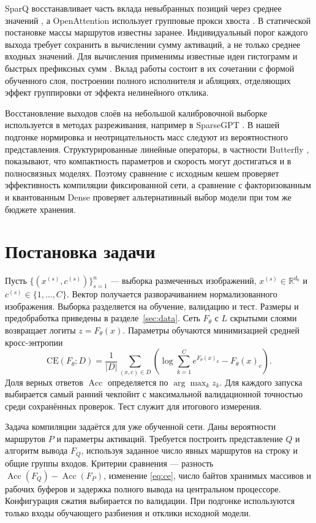 \documentclass[11pt,a4paper]{article}
\newcommand{\CE}{\mathrm{CE}}
\begin{document}
SparQ восстанавливает часть вклада невыбранных позиций через среднее значений \cite{ribar2024}, а OpenAttention использует групповые прокси хвоста \cite{yu2026}. В статической постановке массы маршрутов известны заранее. Индивидуальный порог каждого выхода требует сохранить в вычислении сумму активаций, а не только среднее входных значений. Для вычисления применимы известные идеи гистограмм и быстрых префиксных сумм \cite{porikli2008,langrene2018}. Вклад работы состоит в их сочетании с формой обученного слоя, построении полного исполнителя и абляциях, отделяющих эффект группировки от эффекта нелинейного отклика.

Восстановление выходов слоёв на небольшой калибровочной выборке используется в методах разреживания, например в SparseGPT \cite{frantar2023}. В нашей подгонке нормировка и неотрицательность масс следуют из вероятностного представления. Структурированные линейные операторы, в частности Butterfly \cite{dao2019}, показывают, что компактность параметров и скорость могут достигаться и в полносвязных моделях. Поэтому сравнение с исходным кешем проверяет эффективность компиляции фиксированной сети, а сравнение с факторизованным и квантованным Dense проверяет альтернативный выбор модели при том же бюджете хранения.

\section{Постановка задачи}
Пусть $\{(x^{(s)},c^{(s)})\}_{s=1}^n$ — выборка размеченных изображений, $x^{(s)}\in\mathbb R^{d_0}$ и $c^{(s)}\in\{1,\ldots,C\}$. Вектор получается разворачиванием нормализованного изображения. Выборка разделяется на обучение, валидацию и тест. Размеры и предобработка приведены в разделе~\ref{sec:data}. Сеть $F_\theta$ с $L$ скрытыми слоями возвращает логиты $z=F_\theta(x)$. Параметры обучаются минимизацией средней кросс-энтропии
\begin{equation}
 \CE(F_\theta;D)=\frac1{|D|}\sum_{(x,c)\in D}
 \left(\log\sum_{k=1}^C e^{F_\theta(x)_k}-F_\theta(x)_c\right).
 \label{eq:ce}
\end{equation}
Доля верных ответов $\operatorname{Acc}$ определяется по $\arg\max_k z_k$. Для каждого запуска выбирается самый ранний чекпойнт с максимальной валидационной точностью среди сохранённых проверок. Тест служит для итогового измерения.

Задача компиляции задаётся для уже обученной сети. Даны вероятности маршрутов $P$ и параметры активаций. Требуется построить представление $Q$ и алгоритм вывода $F_Q$, используя заданное число явных маршрутов на строку и общие группы входов. Критерии сравнения — разность $\operatorname{Acc}(F_Q)-\operatorname{Acc}(F_P)$, изменение \eqref{eq:ce}, число байтов хранимых массивов и рабочих буферов и задержка полного вывода на центральном процессоре. Конфигурация сжатия выбирается по валидации. При подгонке используются только входы обучающего разбиения и отклики исходной модели.
\end{document}
